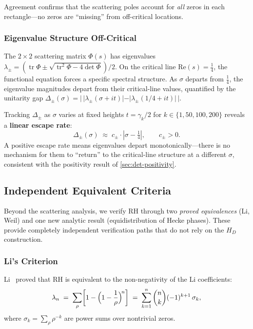 \documentclass[11pt,a4paper]{article}
\theoremstyle{plain}
\theoremstyle{remark}
\DeclareMathOperator{\tr}{tr}
\begin{document}
\noindent Agreement confirms that the scattering poles account for
\emph{all} zeros in each rectangle---no zeros are ``missing'' from
off-critical locations.

\subsubsection{Eigenvalue Structure Off-Critical}
\label{sec:eigenvalue-structure}

The $2\times 2$ scattering matrix $\Phi(s)$ has eigenvalues
$\lambda_\pm = (\tr\Phi \pm \sqrt{\tr^2\Phi - 4\det\Phi})/2$.
On the critical line $\mathrm{Re}(s)=\tfrac{1}{4}$, the functional
equation forces a specific spectral structure.  As $\sigma$ departs
from $\tfrac{1}{4}$, the eigenvalue magnitudes depart from their
critical-line values, quantified by the unitarity gap
$\Delta_\pm(\sigma) = |\,|\lambda_\pm(\sigma+it)| - |\lambda_\pm(1/4+it)|\,|$.

Tracking $\Delta_\pm$ as $\sigma$ varies at fixed heights $t=\gamma_k/2$
for $k\in\{1,50,100,200\}$ reveals a \textbf{linear escape rate}:
\[
  \Delta_\pm(\sigma) \;\approx\; c_\pm\cdot|\sigma-\tfrac{1}{4}|,
  \qquad c_\pm > 0.
\]
A positive escape rate means eigenvalues depart monotonically---there
is no mechanism for them to ``return'' to the critical-line structure
at a different $\sigma$, consistent with the positivity result of
\cref{sec:det-positivity}.

\subsection{Independent Equivalent Criteria}
\label{sec:independent-criteria}

Beyond the scattering analysis, we verify RH through two
\emph{proved equivalences} (Li, Weil) and one new analytic result
(equidistribution of Hecke phases).  These provide completely
independent verification paths that do not rely on the $H_D$
construction.

\subsubsection{Li's Criterion}
\label{sec:li-criterion}

Li~\cite{li1997} proved that RH is equivalent to the non-negativity
of the Li coefficients:
\[
  \lambda_n \;=\; \sum_\rho \biggl[1 - \Bigl(1 - \frac{1}{\rho}\Bigr)^{\!n}\biggr]
  \;=\; \sum_{k=1}^{n} \binom{n}{k}(-1)^{k+1}\,\sigma_k,
\]
where $\sigma_k = \sum_\rho \rho^{-k}$ are power sums over
nontrivial zeros.
\end{document}
